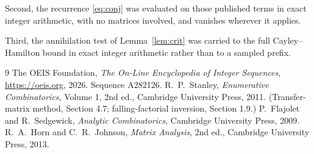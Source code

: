\documentclass[11pt,a4paper]{article}
\theoremstyle{plain}
\theoremstyle{definition}
\begin{document}
Second, the recurrence \eqref{eq:conj} was evaluated on those published terms in exact
integer arithmetic, with no matrices involved, and vanishes wherever it applies.

Third, the annihilation test of Lemma~\ref{lem:crit} was carried to the full
Cayley--Hamilton bound in exact integer arithmetic rather than to a sampled prefix.

\begin{thebibliography}{9}
 The OEIS Foundation, \emph{The On-Line Encyclopedia of Integer
Sequences}, \url{https://oeis.org}, 2026. Sequence A282126.
 R.~P.~Stanley, \emph{Enumerative Combinatorics}, Volume 1, 2nd ed.,
Cambridge University Press, 2011. (Transfer-matrix method, Section 4.7; falling-factorial
inversion, Section 1.9.)
 P.~Flajolet and R.~Sedgewick, \emph{Analytic Combinatorics}, Cambridge
University Press, 2009.
 R.~A.~Horn and C.~R.~Johnson, \emph{Matrix Analysis}, 2nd ed., Cambridge
University Press, 2013.
\end{thebibliography}
\end{document}
